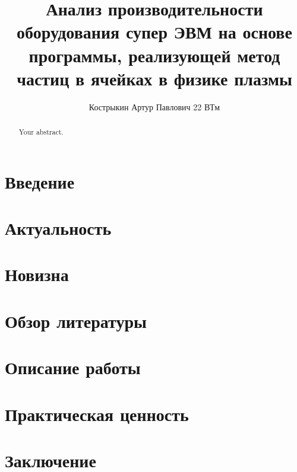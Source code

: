 \documentclass{article}
\title{Анализ производительности оборудования супер ЭВМ на основе программы, реализующей метод частиц в ячейках в физике плазмы}
\author{Кострыкин Артур Павлович 22 ВТм}
\begin{document}
\maketitle

\begin{abstract}
Your abstract.
\end{abstract}

\section{Введение}
\section{Актуальность}
\section{Новизна}
\section{Обзор литературы}

\section{Описание работы}
\section{Практическая ценность}
\section{Заключение}
\end{document}
